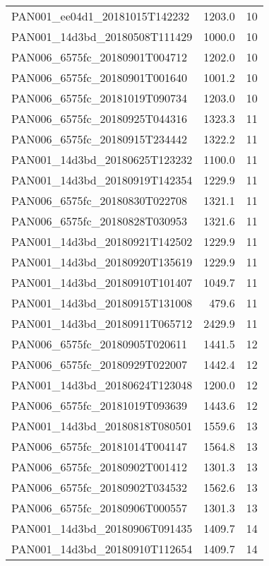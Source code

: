 \begin{tabular}{lrr}
PAN001\_ee04d1\_20181015T142232 &     1203.0 &       10 \\
PAN001\_14d3bd\_20180508T111429 &     1000.0 &       10 \\
PAN006\_6575fc\_20180901T004712 &     1202.0 &       10 \\
PAN006\_6575fc\_20180901T001640 &     1001.2 &       10 \\
PAN006\_6575fc\_20181019T090734 &     1203.0 &       10 \\
PAN006\_6575fc\_20180925T044316 &     1323.3 &       11 \\
PAN006\_6575fc\_20180915T234442 &     1322.2 &       11 \\
PAN001\_14d3bd\_20180625T123232 &     1100.0 &       11 \\
PAN001\_14d3bd\_20180919T142354 &     1229.9 &       11 \\
PAN006\_6575fc\_20180830T022708 &     1321.1 &       11 \\
PAN006\_6575fc\_20180828T030953 &     1321.6 &       11 \\
PAN001\_14d3bd\_20180921T142502 &     1229.9 &       11 \\
PAN001\_14d3bd\_20180920T135619 &     1229.9 &       11 \\
PAN001\_14d3bd\_20180910T101407 &     1049.7 &       11 \\
PAN001\_14d3bd\_20180915T131008 &      479.6 &       11 \\
PAN001\_14d3bd\_20180911T065712 &     2429.9 &       11 \\
PAN006\_6575fc\_20180905T020611 &     1441.5 &       12 \\
PAN006\_6575fc\_20180929T022007 &     1442.4 &       12 \\
PAN001\_14d3bd\_20180624T123048 &     1200.0 &       12 \\
PAN006\_6575fc\_20181019T093639 &     1443.6 &       12 \\
PAN001\_14d3bd\_20180818T080501 &     1559.6 &       13 \\
PAN006\_6575fc\_20181014T004147 &     1564.8 &       13 \\
PAN006\_6575fc\_20180902T001412 &     1301.3 &       13 \\
PAN006\_6575fc\_20180902T034532 &     1562.6 &       13 \\
PAN006\_6575fc\_20180906T000557 &     1301.3 &       13 \\
PAN001\_14d3bd\_20180906T091435 &     1409.7 &       14 \\
PAN001\_14d3bd\_20180910T112654 &     1409.7 &       14 \\

\end{tabular}
